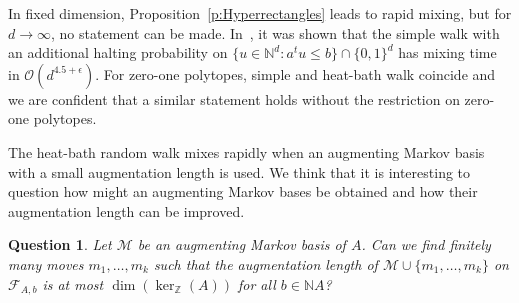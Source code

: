 \documentclass[11pt]{amsart}
\newtheorem{question}[thm]{Question}
\theoremstyle{definition}
\numberwithin{equation}{section}
\newcommand{\ring}[1]{\ensuremath{\mathbb{#1}}}
\renewcommand{\>}{\rangle}
\newcommand{\<}{\langle}
\newcommand{\0}{\mathbf{0}}
\newcommand{\1}{\mathbf{1}}
\newcommand{\2}{\mathbf{2}}
\newcommand\NN{\ring{N}}
\newcommand\ZZ{\ring{Z}}
\newcommand\cM{{\mathcal M}}
\newcommand{\fiber}[2]{\mathcal{F}_{#1,#2}}
\newcommand\cone[1]{\NN#1}
\begin{document}
In fixed dimension, Proposition~\ref{p:Hyperrectangles} leads to rapid
mixing, but for $d\to\infty$, no statement can be made.
In~\cite{Morris2004}, it was shown that the simple walk with an
additional halting probability on $\{u\in\NN^d: a^tu\le
b\}\cap\{0,1\}^d$ has mixing time in $\mathcal{O}(d^{4.5+\epsilon})$.
For zero-one polytopes, simple and heat-bath walk coincide and we are
confident that a similar statement holds without the restriction on
zero-one polytopes.

The heat-bath random walk mixes rapidly when an augmenting Markov
basis with a small augmentation length is used. We think that it is
interesting to question how might an augmenting Markov bases be obtained and
how their augmentation length can be improved.

\begin{question}
Let $\cM$ be an augmenting Markov basis of $A$.  Can we find finitely
many moves $m_1,\dots,m_k$ such that the augmentation length of
$\cM\cup\{m_1,\dots,m_k\}$ on $\fiber{A}{b}$ is at most
$\dim(\ker_\ZZ(A))$ for all $b\in\cone{A}$?
\end{question}



\end{document}
